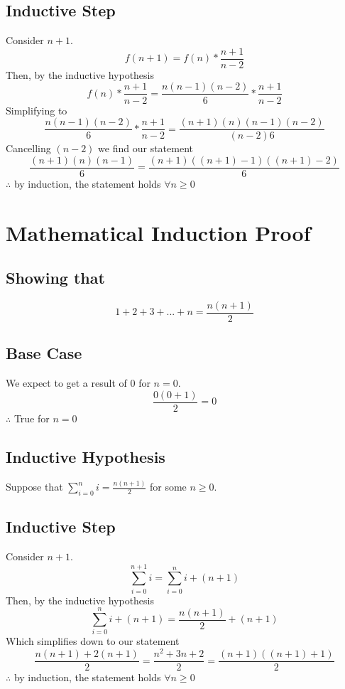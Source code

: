 \documentclass[12pt]{article}
\begin{document}
\subsection{Inductive Step}
Consider $ n+1 $.
\begin{displaymath}
	f(n+1)=f(n)*\frac{n+1}{n-2}
\end{displaymath}
Then, by the inductive hypothesis
\begin{displaymath}
	f(n)*\frac{n+1}{n-2}=\frac{n(n-1)(n-2)}{6}*\frac{n+1}{n-2}
\end{displaymath}
Simplifying to
\begin{displaymath}
	\frac{n(n-1)(n-2)}{6}*\frac{n+1}{n-2} = \frac{(n+1)(n)(n-1)(n-2)}{(n-2)6}
\end{displaymath}
Cancelling $ (n-2) $ we find our statement
\begin{displaymath}
	\frac{(n+1)(n)(n-1)}{6} = \frac{(n+1)((n+1)-1)((n+1)-2)}{6}
\end{displaymath}
$ \therefore $ by induction, the statement holds $ \forall n \geq 0 $

\section{Mathematical Induction Proof}
\subsection{Showing that}
\begin{displaymath}
	1+2+3+...+n=\frac{n(n+1)}{2}
\end{displaymath}
\subsection{Base Case}
We expect to get a result of $ 0 $ for $ n = 0 $.
\begin{displaymath}
	\frac{0(0+1)}{2}=0
\end{displaymath}
$ \therefore $ True for $ n = 0 $
\subsection{Inductive Hypothesis}
Suppose that $ \sum_{i=0}^{n} i = \frac{n(n+1)}{2} $ for some $ n \geq 0 $.
\subsection{Inductive Step}
Consider $ n+1 $.
\begin{displaymath}
	\sum_{i=0}^{n+1} i = \sum_{i=0}^{n} i + (n+1)
\end{displaymath}
Then, by the inductive hypothesis
\begin{displaymath}
	\sum_{i=0}^{n} i+(n+1) = \frac{n(n+1)}{2} + (n+1)
\end{displaymath}
Which simplifies down to our statement
\begin{displaymath}
	\frac{n(n+1)+2(n+1)}{2}=\frac{n^2+3n+2}{2}=\frac{(n+1)((n+1)+1)}{2}
\end{displaymath}
$ \therefore $ by induction, the statement holds $ \forall n \geq 0 $
\end{document}
